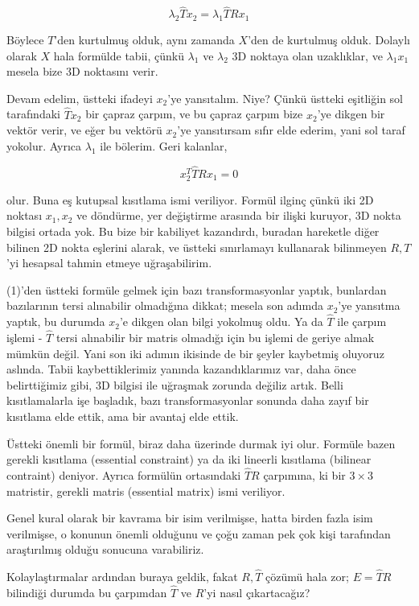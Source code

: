 \documentclass[12pt,fleqn]{article}\usepackage{../../common}
\begin{document}
$$ \lambda_2 \hat{T} x_2 = \lambda_1 \hat{T} R x_1  $$

Böylece $T$'den kurtulmuş olduk, aynı zamanda $X$'den de kurtulmuş
olduk. Dolaylı olarak $X$ hala formülde tabii, çünkü $\lambda_1$ ve $\lambda_2$
3D noktaya olan uzaklıklar, ve $\lambda_1 x_1$ mesela bize 3D noktasını verir.

Devam edelim, üstteki ifadeyi $x_2$'ye yansıtalım. Niye? Çünkü üstteki eşitliğin
sol tarafındaki $\hat{T}x_2$ bir çapraz çarpım, ve bu çapraz çarpım bize
$x_2$'ye dikgen bir vektör verir, ve eğer bu vektörü $x_2$'ye yansıtırsam sıfır
elde ederim, yani sol taraf yokolur. Ayrıca $\lambda_1$ ile bölerim. Geri
kalanlar,

$$ x_2^T \hat{T} R x_1 = 0 $$

olur. Buna eş kutupsal kısıtlama ismi veriliyor. Formül ilginç çünkü iki 2D
noktası $x_1,x_2$ ve döndürme, yer değiştirme arasında bir ilişki kuruyor, 3D
nokta bilgisi ortada yok. Bu bize bir kabiliyet kazandırdı, buradan hareketle
diğer bilinen 2D nokta eşlerini alarak, ve üstteki sınırlamayı kullanarak
bilinmeyen $R,T$'yi hesapsal tahmin etmeye uğraşabilirim.

(1)'den üstteki formüle gelmek için bazı transformasyonlar yaptık, bunlardan
bazılarının tersi alınabilir olmadığına dikkat; mesela son adımda $x_2$'ye
yansıtma yaptık, bu durumda $x_2$'e dikgen olan bilgi yokolmuş oldu. Ya da
$\hat{T}$ ile çarpım işlemi - $\hat{T}$ tersi alınabilir bir matris olmadığı
için bu işlemi de geriye almak mümkün değil. Yani son iki adımın ikisinde de bir
şeyler kaybetmiş oluyoruz aslında. Tabii kaybettiklerimiz yanında
kazandıklarımız var, daha önce belirttiğimiz gibi, 3D bilgisi ile uğraşmak
zorunda değiliz artık. Belli kısıtlamalarla işe başladık, bazı transformasyonlar
sonunda daha zayıf bir kısıtlama elde ettik, ama bir avantaj elde ettik.

Üstteki önemli bir formül, biraz daha üzerinde durmak iyi olur. Formüle bazen
gerekli kısıtlama (essential constraint) ya da iki lineerli kısıtlama (bilinear
contraint) deniyor. Ayrıca formülün ortasındaki $\hat{T} R$ çarpımına, ki bir
$3 \times 3$ matristir, gerekli matris (essential matrix) ismi veriliyor.

Genel kural olarak bir kavrama bir isim verilmişse, hatta birden fazla isim
verilmişse, o konunun önemli olduğunu ve çoğu zaman pek çok kişi tarafından
araştırılmış olduğu sonucuna varabiliriz.

Kolaylaştırmalar ardından buraya geldik, fakat $R,\hat{T}$ çözümü hala zor; $E =
\hat{T}R$ bilindiği durumda bu çarpımdan $\hat{T}$ ve $R$'yi nasıl çıkartacağız?
\end{document}
